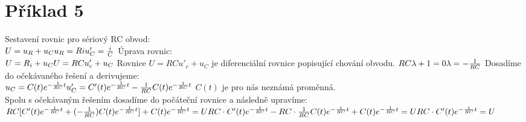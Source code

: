 \section{Příklad 5}
\newline
\Large{Sestavení rovnic pro sériový RC obvod:}\\
\begin{math}
\newline
    U = u_R+u_C\\
    u_R=Ri\\
    u'_C=\frac{i}{C}\\ \\
\end{math}
\Large{Úprava rovnic:} \\
\begin{math}
\newline
    U=R_i+u_C\\
    U=RCu'_c+u_C\\ \\
\end{math}
\Large{Rovnice \(U=RCu'_c+u_C\) je diferenciální rovnice popisující chování obvodu.}
\newpage
{}
\begin{math}
\newline
    RC\lambda+1=0\\
    \lambda=-\frac{1}{RC}\\ \\
\end{math}
\Large{Dosadíme do očekávaného řešení a derivujeme:}\\
\begin{math}
\newline
    u_C=C(t)e^{-\frac{1}{RC}t}\\
    u'_C=C'(t)e^{-\frac{1}{RC}t} -\frac{1}{RC}C(t)e^{-\frac{1}{RC}t}\\ \\
\end{math}
\Large{\(C(t)\) je pro nás neznámá proměnná.}\\ 
\Large{Spolu s očekávaným řešením dosadíme do počáteční rovnice a následně upravíme:}\\
\begin{math}
\newline
    RC[C'(t)e^{-\frac{1}{RC}t}+(-\frac{1}{RC})C(t)e^{-\frac{1}{RC}t}]+C(t)e^{-\frac{1}{RC}t} = U\\
    RC\cdot C'(t)e^{-\frac{1}{RC}t} -RC\cdot \frac{1}{RC}C(t)e^{-\frac{1}{RC}t}+C(t)e^{-\frac{1}{RC}t} = U\\ \\
    RC\cdot C'(t)e^{-\frac{1}{RC}t} = U\\ \\
\end{math}
